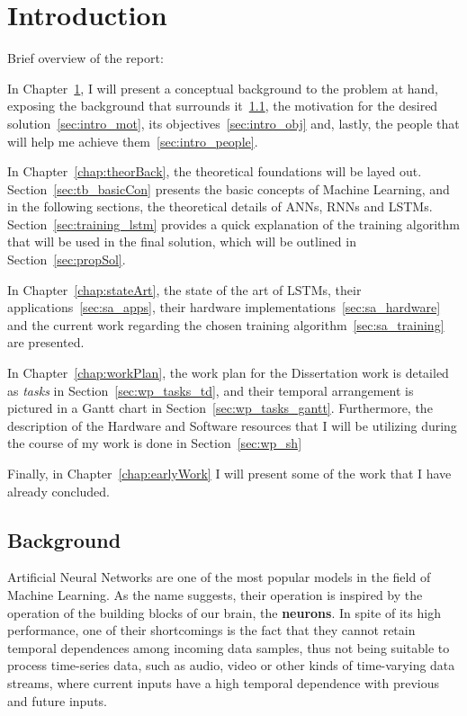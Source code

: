 \chapter{Introduction}\label{chap:intro}
Brief overview of the report:

In Chapter~\ref{chap:intro}, I will present a conceptual background to the problem at hand, exposing the background that surrounds it~\ref{sec:intro_back}, the motivation for the desired solution~\ref{sec:intro_mot}, its objectives~\ref{sec:intro_obj} and, lastly, the people that will help me achieve them~\ref{sec:intro_people}.

In Chapter~\ref{chap:theorBack}, the theoretical foundations will be layed out. Section~\ref{sec:tb_basicCon} presents the basic concepts of Machine Learning, and in the following sections, the theoretical details of ANNs, RNNs and LSTMs. Section~\ref{sec:training_lstm} provides a quick explanation of the training algorithm that will be used in the final solution, which will be outlined in Section~\ref{sec:propSol}.

In Chapter~\ref{chap:stateArt}, the state of the art of LSTMs, their applications~\ref{sec:sa_apps}, their hardware implementations~\ref{sec:sa_hardware} and the current work regarding the chosen training algorithm~\ref{sec:sa_training} are presented.

In Chapter~\ref{chap:workPlan}, the work plan for the Dissertation work is detailed as \emph{tasks} in Section~\ref{sec:wp_tasks_td}, and their temporal arrangement is pictured in a Gantt chart in Section~\ref{sec:wp_tasks_gantt}. Furthermore, the description of the Hardware and Software resources that I will be utilizing during the course of my work is done in Section~\ref{sec:wp_sh}

Finally, in Chapter~\ref{chap:earlyWork} I will present some of the work that I have already concluded.

\section{Background}\label{sec:intro_back}
Artificial Neural Networks are one of the most popular models in the field of Machine Learning. As the name suggests, their operation is inspired by the operation of the building blocks of our brain, the \textbf{neurons}. In spite of its high performance, one of their shortcomings is the fact that they cannot retain temporal dependences among incoming data samples, thus not being suitable to process time-series data, such as audio, video or other kinds of time-varying data streams, where current inputs have a high temporal dependence with previous and future inputs. 

